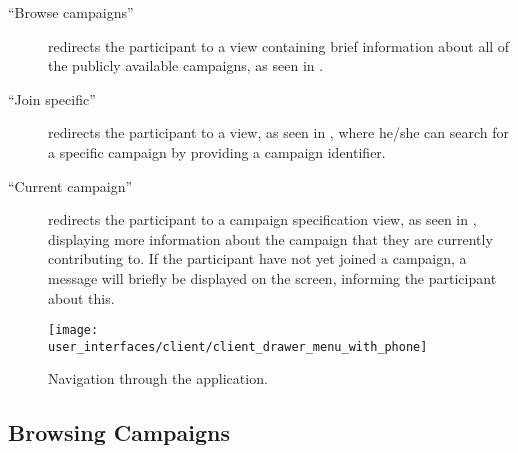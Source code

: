 \begin{description}
    \item[``Browse campaigns''] redirects the participant to a view containing brief information about all of the publicly available campaigns, as seen in .

    \item[``Join specific''] redirects the participant to a view, as seen in , where he/she can search for a specific campaign by providing a campaign identifier.

    \item[``Current campaign''] redirects the participant to a campaign specification view, as seen in , displaying more information about the campaign that they are currently contributing to. If the participant have not yet joined a campaign, a message will briefly be displayed on the screen, informing the participant about this.
\end{description}

\begin{figure}[!htbp]
    \centering
    \texttt{[image: user\_interfaces/client/client\_drawer\_menu\_with\_phone]}
    \caption{Navigation through the application.}
    \label{fig:navigation}
\end{figure}
\FloatBarrier

\subsection{Browsing Campaigns}
\label{sub:browsing_campaigns}

